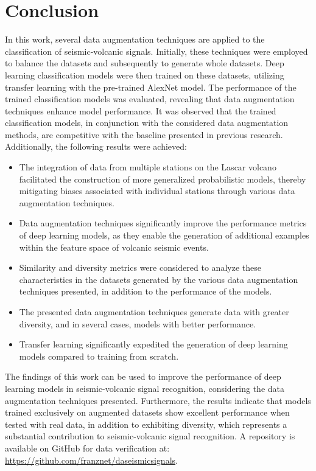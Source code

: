 \documentclass[journal]{IEEEtran}
\begin{document}
\section{Conclusion}\label{conclusion}
In this work, several data augmentation techniques are applied to the classification of seismic-volcanic signals. Initially, these techniques were employed to balance the datasets and subsequently to generate whole datasets. Deep learning classification models were then trained on these datasets, utilizing transfer learning with the pre-trained AlexNet model.
The performance of the trained classification models was evaluated, revealing that data augmentation techniques enhance model performance.
It was observed that the trained classification models, in conjunction with the considered data augmentation methods, are competitive with the baseline presented in previous research. Additionally, the following results were achieved:
\begin{itemize}
\item The integration of data from multiple stations on the Lascar volcano facilitated the construction of more generalized probabilistic models, thereby mitigating biases associated with individual stations through various data augmentation techniques.
\item Data augmentation techniques significantly improve the performance metrics of deep learning models, as they enable the generation of additional examples within the feature space of volcanic seismic events.
\item Similarity and diversity metrics were considered to analyze these characteristics in the datasets generated by the various data augmentation techniques presented, in addition to the performance of the models.
\item The presented data augmentation techniques generate data with greater diversity, and in several cases, models with better performance.
\item Transfer learning significantly expedited the generation of deep learning models compared to training from scratch.
\end{itemize}
The findings of this work can be used to improve the performance of deep learning models in seismic-volcanic signal recognition, considering the data augmentation techniques presented. Furthermore, the results indicate that models trained exclusively on augmented datasets show excellent performance when tested with real data, in addition to exhibiting diversity, which represents a substantial contribution to seismic-volcanic signal recognition.
A repository is available on GitHub for data verification at: \href{https://github.com/franznet/daseismicsignals}{\color{blue}https://github.com/franznet/daseismicsignals}.
\end{document}
